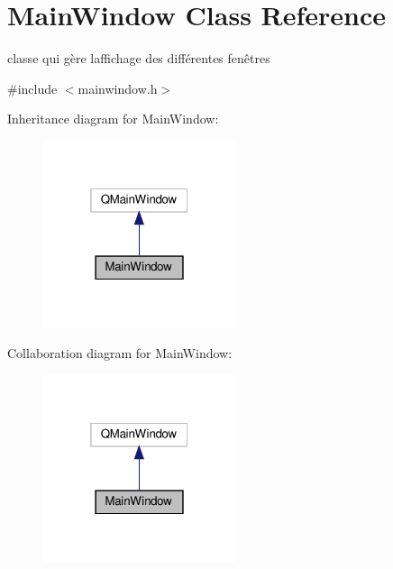 \hypertarget{class_main_window}{}\section{Main\+Window Class Reference}
\label{class_main_window}


classe qui gère l\textquotesingle{}affichage des différentes fenêtres  




{\ttfamily \#include $<$mainwindow.\+h$>$}



Inheritance diagram for Main\+Window\+:
\nopagebreak
\begin{figure}[H]
\begin{center}
\leavevmode
\includegraphics[width=160pt]{class_main_window__inherit__graph}
\end{center}
\end{figure}


Collaboration diagram for Main\+Window\+:
\nopagebreak
\begin{figure}[H]
\begin{center}
\leavevmode
\includegraphics[width=160pt]{class_main_window__coll__graph}
\end{center}
\end{figure}

